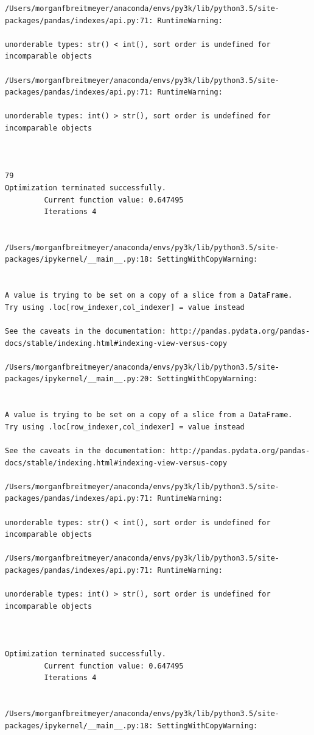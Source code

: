 \begin{lstlisting}
/Users/morganfbreitmeyer/anaconda/envs/py3k/lib/python3.5/site-packages/pandas/indexes/api.py:71: RuntimeWarning:

unorderable types: str() < int(), sort order is undefined for incomparable objects

/Users/morganfbreitmeyer/anaconda/envs/py3k/lib/python3.5/site-packages/pandas/indexes/api.py:71: RuntimeWarning:

unorderable types: int() > str(), sort order is undefined for incomparable objects



79
Optimization terminated successfully.
         Current function value: 0.647495
         Iterations 4


/Users/morganfbreitmeyer/anaconda/envs/py3k/lib/python3.5/site-packages/ipykernel/__main__.py:18: SettingWithCopyWarning:


A value is trying to be set on a copy of a slice from a DataFrame.
Try using .loc[row_indexer,col_indexer] = value instead

See the caveats in the documentation: http://pandas.pydata.org/pandas-docs/stable/indexing.html#indexing-view-versus-copy

/Users/morganfbreitmeyer/anaconda/envs/py3k/lib/python3.5/site-packages/ipykernel/__main__.py:20: SettingWithCopyWarning:


A value is trying to be set on a copy of a slice from a DataFrame.
Try using .loc[row_indexer,col_indexer] = value instead

See the caveats in the documentation: http://pandas.pydata.org/pandas-docs/stable/indexing.html#indexing-view-versus-copy

/Users/morganfbreitmeyer/anaconda/envs/py3k/lib/python3.5/site-packages/pandas/indexes/api.py:71: RuntimeWarning:

unorderable types: str() < int(), sort order is undefined for incomparable objects

/Users/morganfbreitmeyer/anaconda/envs/py3k/lib/python3.5/site-packages/pandas/indexes/api.py:71: RuntimeWarning:

unorderable types: int() > str(), sort order is undefined for incomparable objects



Optimization terminated successfully.
         Current function value: 0.647495
         Iterations 4


/Users/morganfbreitmeyer/anaconda/envs/py3k/lib/python3.5/site-packages/ipykernel/__main__.py:18: SettingWithCopyWarning:



\end{lstlisting}
